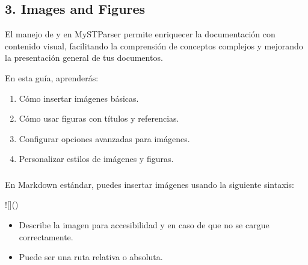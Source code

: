 \documentclass[a4paper,10pt,oneside,spanish,openany]{sphinxmanual}
\begin{document}
\subsection{3. Images and Figures}
\label{\detokenize{configuracion_inicial/013.guia_de_myst_parser:images-and-figures}}
\sphinxAtStartPar
El manejo de  y  en MyST\sphinxhyphen{}Parser permite enriquecer la documentación con contenido visual, facilitando la comprensión de conceptos complejos y mejorando la presentación general de tus documentos.

\sphinxAtStartPar
En esta guía, aprenderás:
\begin{enumerate}
%
\item {} 
\sphinxAtStartPar
Cómo insertar imágenes básicas.

\item {} 
\sphinxAtStartPar
Cómo usar figuras con títulos y referencias.

\item {} 
\sphinxAtStartPar
Configurar opciones avanzadas para imágenes.

\item {} 
\sphinxAtStartPar
Personalizar estilos de imágenes y figuras.

\end{enumerate}


\subsubsection{}
\label{\detokenize{configuracion_inicial/013.guia_de_myst_parser:imagenes-basicas-en-myst-parser}}

\paragraph{}
\label{\detokenize{configuracion_inicial/013.guia_de_myst_parser:sintaxis-basica-para-insertar-una-imagen}}
\sphinxAtStartPar
En Markdown estándar, puedes insertar imágenes usando la siguiente sintaxis:

\begin{sphinxVerbatim}[commandchars=\\\{\}]
![]()
\end{sphinxVerbatim}
\begin{itemize}
\item {} 
\sphinxAtStartPar
{} Describe la imagen para accesibilidad y en caso de que no se cargue correctamente.

\item {} 
\sphinxAtStartPar
{} Puede ser una ruta relativa o absoluta.

\end{itemize}
\end{document}
